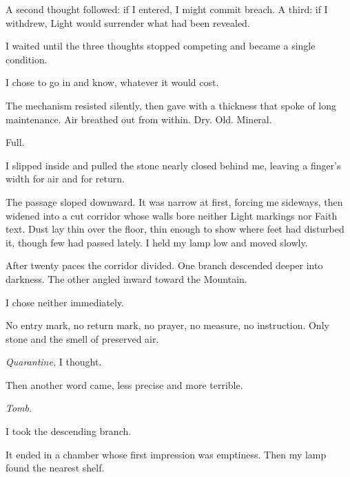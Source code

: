 A second thought followed: if I entered, I might commit breach. A third: if I withdrew, Light would surrender what had been revealed.\par

I waited until the three thoughts stopped competing and became a single condition.\par

I chose to go in and know, whatever it would cost.\par

The mechanism resisted silently, then gave with a thickness that spoke of long maintenance. Air breathed out from within. Dry. Old. Mineral.\par

Full.\par

I slipped inside and pulled the stone nearly closed behind me, leaving a finger's width for air and for return.\par

The passage sloped downward. It was narrow at first, forcing me sideways, then widened into a cut corridor whose walls bore neither Light markings nor Faith text. Dust lay thin over the floor, thin enough to show where feet had disturbed it, though few had passed lately. I held my lamp low and moved slowly.\par

After twenty paces the corridor divided. One branch descended deeper into darkness. The other angled inward toward the Mountain.\par

I chose neither immediately.\par

No entry mark, no return mark, no prayer, no measure, no instruction. Only stone and the smell of preserved air.\par

\textit{Quarantine,} I thought.\par

Then another word came, less precise and more terrible.\par

\textit{Tomb.}\par

I took the descending branch.\par

It ended in a chamber whose first impression was emptiness. Then my lamp found the nearest shelf.\par

